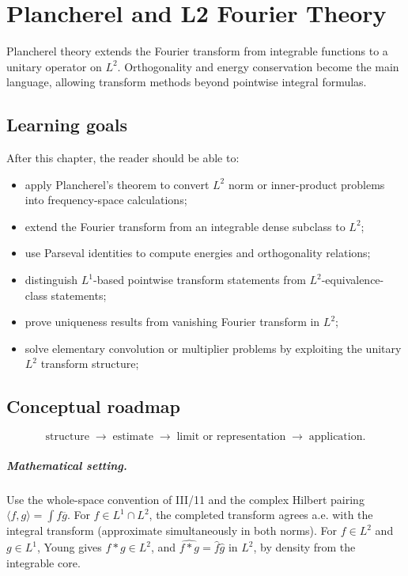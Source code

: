 \chapter{Plancherel and L2 Fourier Theory}
\label{ch:iii13}

Plancherel theory extends the Fourier transform from integrable functions to a unitary operator on $L^2$. Orthogonality and energy conservation become the main language, allowing transform methods beyond pointwise integral formulas.

\section*{Learning goals}
After this chapter, the reader should be able to:
\begin{itemize}
\item apply Plancherel's theorem to convert \(L^2\) norm or inner-product problems into frequency-space calculations;
\item extend the Fourier transform from an integrable dense subclass to \(L^2\);
\item use Parseval identities to compute energies and orthogonality relations;
\item distinguish \(L^1\)-based pointwise transform statements from \(L^2\)-equivalence-class statements;
\item prove uniqueness results from vanishing Fourier transform in \(L^2\);
\item solve elementary convolution or multiplier problems by exploiting the unitary \(L^2\) transform structure;
\end{itemize}
\section*{Conceptual roadmap}
\[
\boxed{\text{structure}\;\longrightarrow\;\text{estimate}\;\longrightarrow\;\text{limit or representation}\;\longrightarrow\;\text{application}.}
\]

\paragraph{Mathematical setting.}
Use the whole-space convention of III/11 and the complex Hilbert pairing $\langle f,g\rangle=\int f\overline g$. For $f\in L^1\cap L^2$, the completed transform agrees a.e. with the integral transform (approximate simultaneously in both norms). For $f\in L^2$ and $g\in L^1$, Young gives $f*g\in L^2$, and $\widehat{f*g}=\widehat f\widehat g$ in $L^2$, by density from the integrable core.

